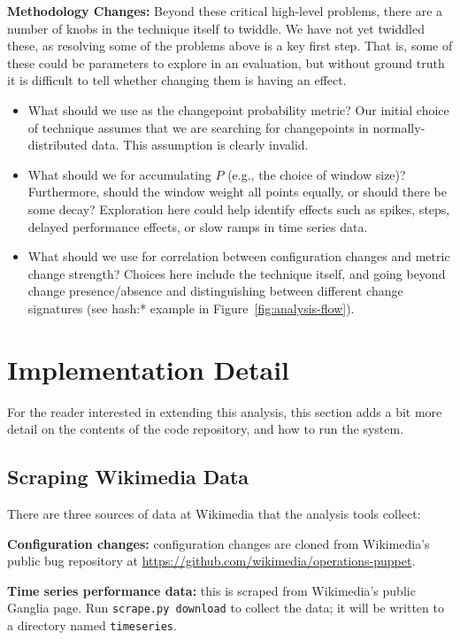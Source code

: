 \documentclass[twocolumn]{article}
\begin{document}
\textbf{Methodology Changes:} Beyond these critical high-level problems, there are a number of knobs in the technique itself to twiddle. We have not yet twiddled these, as resolving some of the problems above is a key first step. That is, some of these could be parameters to explore in an evaluation, but without ground truth it is difficult to tell whether changing them is having an effect.
\begin{itemize}
\item What should we use as the changepoint probability metric? Our initial choice of technique assumes that we are searching for changepoints in normally-distributed data. This assumption is clearly invalid.
\item What should we for accumulating $P$ (e.g., the choice of window size)? Furthermore, should the window weight all points equally, or should there be some decay? Exploration here could help identify effects such as spikes, steps, delayed performance effects, or slow ramps in time series data.
\item What should we use for correlation between configuration changes and metric change strength? Choices here include the technique itself, and going beyond change presence/absence and distinguishing between different change signatures (see \textsf{hash:*} example in Figure~\ref{fig:analysis-flow}).
\end{itemize}

\appendix

\section{Implementation Detail}
For the reader interested in extending this analysis, this section adds a bit more detail on the contents of the code repository, and how to run the system.

\subsection{Scraping Wikimedia Data}
\label{sec:scraping}
There are three sources of data at Wikimedia that the analysis tools collect:

\textbf{Configuration changes:} configuration changes are cloned from Wikimedia's public bug repository at \url{https://github.com/wikimedia/operations-puppet}.

\textbf{Time series performance data:} this is scraped from Wikimedia's public Ganglia page. Run \texttt{scrape.py download} to collect the data; it will be written to a directory named \texttt{timeseries}.
\end{document}
